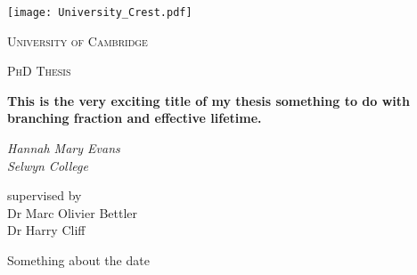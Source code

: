 \begin{titlepage}
  \centering
  \texttt{[image: University\_Crest.pdf]}\par\vspace{1cm}
  {\scshape\LARGE  University of Cambridge \par}
  \vspace{1cm}
  {\scshape\Large PhD Thesis\par}
  \vspace{1.5cm}
  {\LARGE\bfseries This is the very exciting title of my thesis something to do with \bsmumu branching fraction and effective lifetime.\par}
  \vspace{2cm}
  {\Large\itshape Hannah Mary Evans\\
    Selwyn College\par}
  \vfill
  {\large
  supervised by \\
  Dr Marc Olivier Bettler \\
  Dr Harry Cliff \\
  }
  \vfill

  {\large Something about the date}
\end{titlepage}

